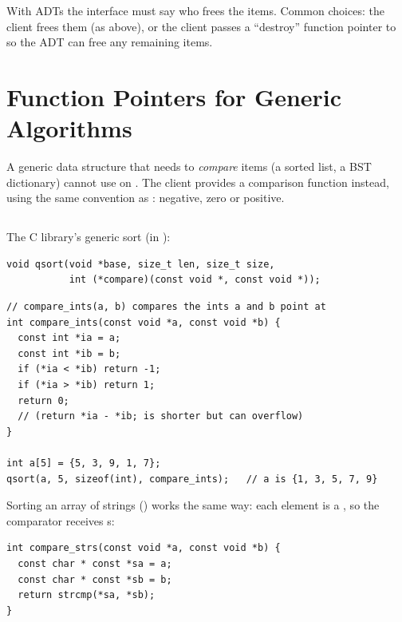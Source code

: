 \begin{important}
With  ADTs the interface must say who frees the items. Common choices: the client
frees them (as above), or the client passes a ``destroy'' function pointer to
 so the ADT can free any remaining items.
\end{important}

\section{Function Pointers for Generic Algorithms}

A generic data structure that needs to \emph{compare} items (a sorted list, a BST dictionary)
cannot use \code{<} on . The client provides a comparison function instead, using
the same convention as : negative, zero or positive.

\subsection{}

The C library's generic sort (in ):
\begin{lstlisting}[style=c]
void qsort(void *base, size_t len, size_t size,
           int (*compare)(const void *, const void *));
\end{lstlisting}
\begin{lstlisting}[style=c]
// compare_ints(a, b) compares the ints a and b point at
int compare_ints(const void *a, const void *b) {
  const int *ia = a;
  const int *ib = b;
  if (*ia < *ib) return -1;
  if (*ia > *ib) return 1;
  return 0;
  // (return *ia - *ib; is shorter but can overflow)
}

int a[5] = {5, 3, 9, 1, 7};
qsort(a, 5, sizeof(int), compare_ints);   // a is {1, 3, 5, 7, 9}
\end{lstlisting}
Sorting an array of strings () works the same way: each element is a
, so the comparator receives s:
\begin{lstlisting}[style=c]
int compare_strs(const void *a, const void *b) {
  const char * const *sa = a;
  const char * const *sb = b;
  return strcmp(*sa, *sb);
}
\end{lstlisting}

